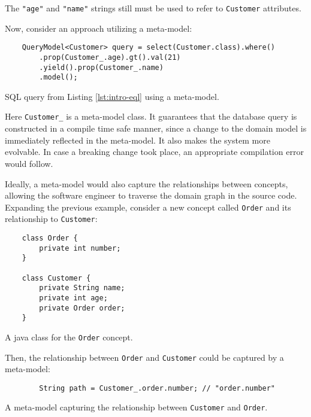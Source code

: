 The \texttt{"age"} and \texttt{"name"} strings still must be used to refer to \texttt{Customer} attributes.

\smallskip

Now, consider an approach utilizing a meta-model:

\begin{listing}[H]
    \begin{verbatim}
    QueryModel<Customer> query = select(Customer.class).where()
        .prop(Customer_.age).gt().val(21)
        .yield().prop(Customer_.name)
        .model();
    \end{verbatim}
    \caption{SQL query from Listing \ref{lst:intro-eql} using a meta-model.}
    \label{lst:intro-sql-meta}
\end{listing}

Here \texttt{Customer\_} is a meta-model class. 
It guarantees that the database query is constructed in a compile time safe manner, since a change to the domain model is immediately reflected in the meta-model.
It also makes the system more evolvable. In case a breaking change took place, an appropriate compilation error would follow.

\n

Ideally, a meta-model would also capture the relationships between concepts, allowing the software engineer to traverse the domain graph in the source code.
Expanding the previous example, consider a new concept called \texttt{Order} and its relationship to \texttt{Customer}:

\begin{listing}[H]
    \begin{verbatim}
    class Order {
        private int number;
    }

    class Customer {
        private String name;
        private int age;
        private Order order;
    }
    \end{verbatim}
    \caption{A java class for the \texttt{Order} concept.}
    \label{lst:intro-order}
\end{listing}

Then, the relationship between \texttt{Order} and \texttt{Customer} could be captured by a meta-model:

\begin{listing}[H]
    \begin{verbatim}
        String path = Customer_.order.number; // "order.number"
    \end{verbatim}
    \caption{A meta-model capturing the relationship between \texttt{Customer} and \texttt{Order}.}
    \label{lst:intro-customer-order}
\end{listing}

